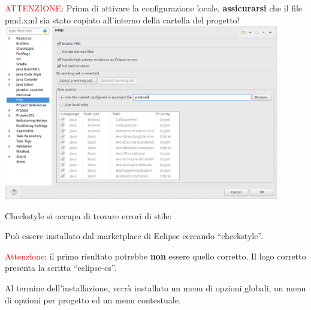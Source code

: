 \documentclass[presentation]{beamer}
\begin{document}
 {
	\textcolor{red}{ATTENZIONE}: Prima di attivare la configurazione locale, \textbf{assicurarsi} che il file pmd.xml sia stato copiato all'interno della cartella del progetto!
	\centering
	\includegraphics[width=0.9\textwidth]{img/pmdproj}
}

 {
	 {
		Checkstyle si occupa di trovare errori di stile:
	}
}

 {
	 {
		Può essere installato dal marketplace di Eclipse cercando ``checkstyle''.
		
		\textcolor{red}{Attenzione}: il primo risultato potrebbe \textbf{non} essere quello corretto. Il logo corretto presenta la scritta ``eclipse-cs''.

		Al termine dell'installazione, verrà  installato un menu di opzioni globali, un menu di opzioni per progetto ed un menu contestuale.
	}
}
\end{document}
